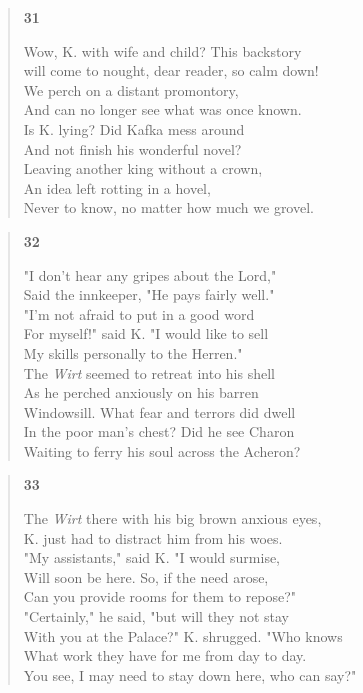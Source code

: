 \documentclass{article}
\begin{document}
\begin{verse}
  \begin{center}
    \textbf{31} \\
  \end{center}
  Wow, K. with wife and child? This backstory \\
  will come to nought, dear reader, so calm down! \\
  We perch on a distant promontory, \\
  And can no longer see what was once known. \\
  Is K. lying? Did Kafka mess around \\
  And not finish his wonderful novel? \\
  Leaving another king without a crown, \\
  An idea left rotting in a hovel, \\
  Never to know, no matter how much we grovel.
\end{verse}

\newpage
\begin{verse}
  \begin{center}
    \textbf{32} \\
  \end{center}
  "I don't hear any gripes about the Lord," \\
  Said the innkeeper, "He pays fairly well." \\
  "I'm not afraid to put in a good word \\
  For myself!" said K. "I would like to sell \\
  My skills personally to the Herren." \\
  The \textit{Wirt} seemed to retreat into his shell \\
  As he perched anxiously on his barren \\
  Windowsill. What fear and terrors did dwell \\
  In the poor man's chest? Did he see Charon \\
  Waiting to ferry his soul across the Acheron?
\end{verse}

\begin{verse}
  \begin{center}
    \textbf{33} \\
  \end{center}
  The \textit{Wirt} there with his big brown anxious eyes, \\
  K. just had to distract him from his woes. \\
  "My assistants," said K. "I would surmise, \\
  Will soon be here. So, if the need arose, \\
  Can you provide rooms for them to repose?" \\
  "Certainly," he said, "but will they not stay \\
  With you at the Palace?" K. shrugged. "Who knows \\
  What work they have for me from day to day. \\
  You see, I may need to stay down here, who can say?"
\end{verse}
\end{document}
